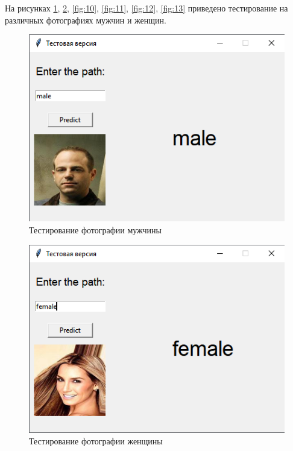 На рисунках \ref{fig:8}, \ref{fig:9}, \ref{fig:10}, \ref{fig:11}, \ref{fig:12}, \ref{fig:13} приведено тестирование на различных фотографиях мужчин и женщин. 
\begin{figure}[!h] 
  \center
  \includegraphics [scale=1.2] {img/testmale1.png}
  \caption{Тестирование фотографии мужчины} 
  \label{fig:8}  
\end{figure}

\begin{figure}[!h] 
  \center
  \includegraphics [scale=1.2] {img/testfemale1.png}
  \caption{Тестирование фотографии женщины} 
  \label{fig:9}  
\end{figure}

